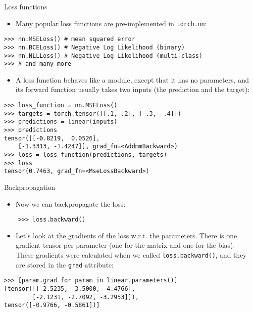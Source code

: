 \begin{vbframe}{Loss functions}
\begin{itemize}
\item Many popular loss functions are pre-implemented in \texttt{torch.nn}:
\end{itemize}
\begin{verbatim}
>>> nn.MSELoss() # mean squared error
>>> nn.BCELoss() # Negative Log Likelihood (binary)
>>> nn.NLLLoss() # Negative Log Likelihood (multi-class)
>>> # and many more
\end{verbatim}
\begin{itemize}
\item A loss function behaves like a module, except that it has no parameters, and its forward function usually takes two inputs (the prediction and the target):
\end{itemize}
\begin{verbatim}
>>> loss_function = nn.MSELoss()
>>> targets = torch.tensor([[.1, .2], [-.3, -.4]])
>>> predictions = linear(inputs)
>>> predictions
tensor([[-0.8219,  0.0526],
	[-1.3313, -1.4247]], grad_fn=<AddmmBackward>)
>>> loss = loss_function(predictions, targets)
>>> loss
tensor(0.7463, grad_fn=<MseLossBackward>)
\end{verbatim}
\end{vbframe}
	
\begin{vbframe}{Backpropagation}
\begin{itemize}
\item Now we can backpropagate the loss:
\end{itemize}
\begin{verbatim}
	>>> loss.backward()
\end{verbatim}
\vfill
\begin{itemize}
\item Let's look at the gradients of the loss w.r.t. the parameters. There is one gradient tensor per parameter (one for the matrix and one for the bias). These gradients were calculated when we called \texttt{loss.backward()}, and they are stored in the \texttt{grad} attribute:
\end{itemize}
\begin{verbatim}
>>> [param.grad for param in linear.parameters()]
[tensor([[-2.5235, -3.5000, -4.4766],
		[-2.1231, -2.7092, -3.2953]]), 
tensor([-0.9766, -0.5861])]
\end{verbatim}
\end{vbframe}
		
